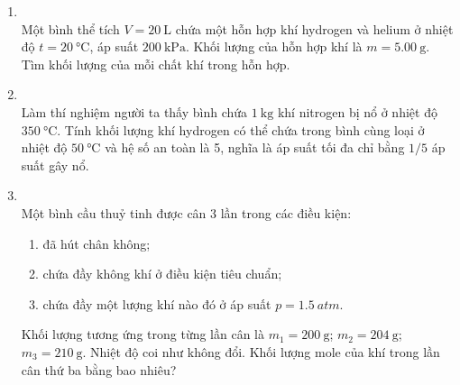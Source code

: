 \begin{enumerate}[label=\bfseries Câu \arabic*:, leftmargin=1.7cm]
\item {}\\
Một bình thể tích $V=\SI{20}{\liter}$ chứa một hỗn hợp khí hydrogen và helium ở nhiệt độ $t=\SI{20}{\celsius}$, áp suất $\SI{200}{\kilo\pascal}$. Khối lượng của hỗn hợp  khí là $m=\SI{5.00}{\gram}$. Tìm khối lượng của mỗi chất khí trong hỗn hợp.

\item {}\\
Làm thí nghiệm người ta thấy bình chứa $\SI{1}{\kilogram}$ khí nitrogen bị nổ ở nhiệt độ $\SI{350}{\celsius}$. Tính khối lượng khí hydrogen có thể chứa trong bình cùng loại ở nhiệt độ $\SI{50}{\celsius}$ và hệ số an toàn là 5, nghĩa là áp suất tối đa chỉ bằng $1/5$ áp suất gây nổ.

\item {}\\
Một bình cầu thuỷ tinh được cân 3 lần trong các điều kiện:
\begin{enumerate}[label=\alph*)]
	\item đã hút chân không;
	\item chứa đầy không khí ở điều kiện tiêu chuẩn;
	\item chứa đầy một lượng khí nào đó ở áp suất $p=\SI{1.5}{atm}$.
\end{enumerate}
Khối lượng tương ứng trong từng lần cân là $m_1=\SI{200}{\gram}$; $m_2=\SI{204}{\gram}$; $m_3=\SI{210}{\gram}$.
Nhiệt độ coi như không đổi. Khối lượng mole của khí trong lần cân thứ ba bằng bao nhiêu?


\end{enumerate}
